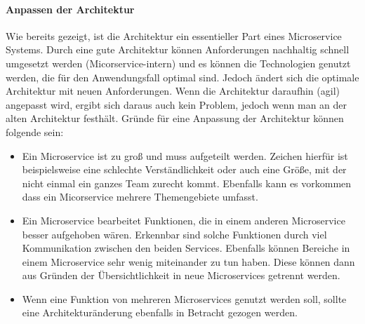 \paragraph{Anpassen der Architektur} Wie bereits gezeigt, ist die Architektur ein essentieller Part eines Microservice Systems. Durch eine gute Architektur können Anforderungen nachhaltig schnell umgesetzt werden (Micorservice-intern) und es können die Technologien genutzt werden, die für den Anwendungsfall optimal sind. \newline
Jedoch ändert sich die optimale Architektur mit neuen Anforderungen. Wenn die Architektur daraufhin (agil) angepasst wird, ergibt sich daraus auch kein Problem, jedoch wenn man an der alten Architektur festhält. \newline
Gründe für eine Anpassung der Architektur können folgende sein: \begin{itemize}
	\item Ein Microservice ist zu groß und muss aufgeteilt werden. Zeichen hierfür ist beispielsweise eine schlechte Verständlichkeit oder auch eine Größe, mit der nicht einmal ein ganzes Team zurecht kommt. Ebenfalls kann es vorkommen dass ein Micorservice mehrere Themengebiete umfasst.
	\item Ein Microservice bearbeitet Funktionen, die in einem anderen Microservice besser aufgehoben wären. Erkennbar sind solche Funktionen durch viel Kommunikation zwischen den beiden Services. Ebenfalls können Bereiche in einem Microservice sehr wenig miteinander zu tun haben. Diese können dann aus Gründen der Übersichtlichkeit in neue Microservices getrennt werden.
	\item Wenn eine Funktion von mehreren Microservices genutzt werden soll, sollte eine Architekturänderung ebenfalls in Betracht gezogen werden.
\end{itemize}
